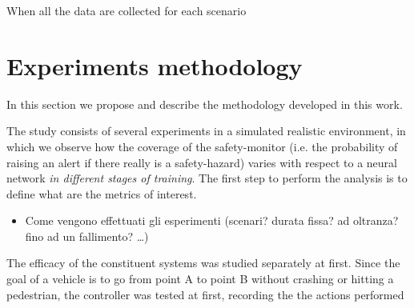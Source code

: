 When all the data are collected for each scenario

\section{Experiments methodology}

In this section we propose and describe the methodology developed in this work.\newline

The study consists of several experiments in a simulated realistic environment, in which we observe how the coverage of the safety-monitor (i.e. the probability of raising an alert if there really is a safety-hazard) varies with respect to a neural network \textsl{in different stages of training}.\newline
The first step to perform the analysis is to define what are the metrics of interest.

	\begin{itemize}
		
		\item Come vengono effettuati gli esperimenti (scenari? durata fissa? ad oltranza? fino ad un fallimento? \dots)
		
	\end{itemize}

The efficacy of the constituent systems was studied separately at first. Since the goal of a vehicle is to go from point A to point B without crashing or hitting a pedestrian, the controller was tested at first, recording the the actions performed 